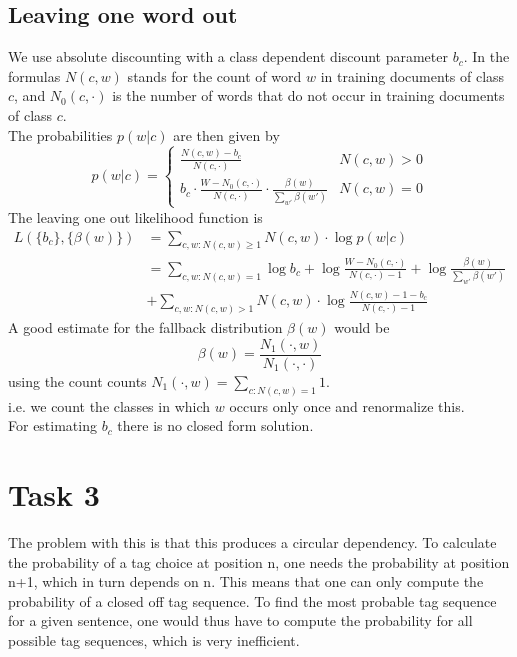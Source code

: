 \documentclass[%
   11pt,              %
   ngerman,           %
   a4paper,           %
   DIV11,             %
]{scrartcl}%
\begin{document}
\subsection*{Leaving one word out}
We use absolute discounting with a class dependent discount parameter $b_c$. In the formulas $N(c,w)$ stands for the count of word $w$ in training documents of class $c$, and $N_0(c, \cdot)$ is the number of words that do not occur in training documents of class $c.$\\
The probabilities $p(w|c)$ are then given by
\begin{equation*}
	p(w|c) = 
	\begin{cases}
		\frac{N(c,w) - b_c}{N(c, \cdot)} & N(c,w) > 0 \\
		b_c \cdot \frac{W - N_0(c, \cdot)}{N(c, \cdot)} \cdot \frac{\beta(w)}{\sum_{w'}\beta(w')} & N(c,w) = 0
	\end{cases}
\end{equation*}
The leaving one out likelihood function is
\begin{align*}
	L(\{b_c\},\{\beta(w)\}) &= \sum_{c,w: N(c,w) \geq 1}N(c,w) \cdot \log p(w|c) \\
	&= \sum_{c,w: N(c,w) = 1}\log b_c + \log \frac{W - N_0(c, \cdot)}{N(c,\cdot) - 1} + \log \frac{\beta(w)}{\sum_{w'}\beta(w')} \\
	&+ \sum_{c,w: N(c,w) > 1}N(c,w) \cdot \log \frac{N(c,w) - 1 - b_c}{N(c,\cdot) - 1}
\end{align*}
A good estimate for the fallback distribution $\beta(w)$ would be
\begin{equation*}
	\beta(w) = \frac{N_1(\cdot, w)}{N_1(\cdot, \cdot)}
\end{equation*}
using the count counts $N_1(\cdot, w) = \sum_{c: N(c,w) = 1} 1$.\\
i.e. we count the classes in which $w$ occurs only once and renormalize this. \\
For estimating $b_c$ there is no closed form solution.
\section*{Task 3}
The problem with this is that this produces a circular dependency. To calculate the probability of a tag choice at position n, one needs the probability at position n+1, which in turn depends on n. This means that one can only compute the probability of a closed off tag sequence. To find the most probable tag sequence for a given sentence, one would thus have to compute the probability for all possible tag sequences, which is very inefficient.
\end{document}
